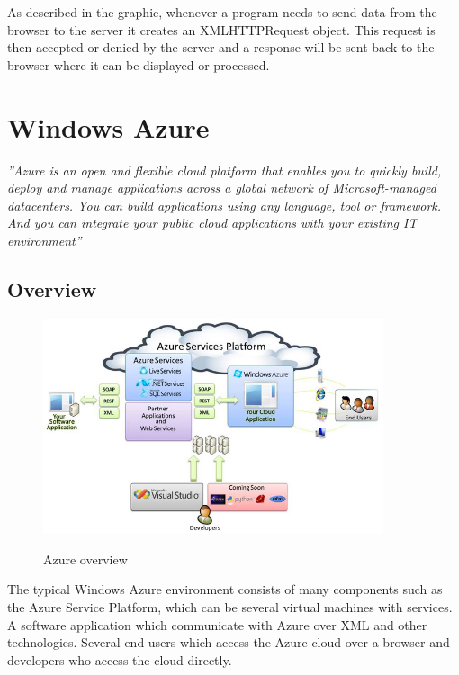   As described in the graphic, whenever a program needs to send data from the browser to the server it creates an XMLHTTPRequest object. This request is then accepted or denied by the server and a response will be sent back to the browser where it can be displayed or processed. 
  
  \section{Windows Azure}
  \textit{''Azure is an open and flexible cloud platform that enables you to quickly build, deploy and manage applications across a global network of Microsoft-managed datacenters. You can build applications using any language, tool or framework. And you can integrate your public cloud applications with your existing IT environment''}\cite{azure}
  \subsection{Overview}
  \begin{figure}[htbp]
  \centering
  \includegraphics[width=100mm,height=\textheight,keepaspectratio]{graphics/azurePlattform.jpg}
  \caption{Azure overview}\cite{azureOver}
  \end{figure}
  
  The typical Windows Azure environment consists of many components such as the Azure Service Platform, which can be several virtual machines with services. A software application which communicate with Azure over XML and other technologies. Several end users which access the Azure cloud over a browser and developers who access the cloud directly. 
  \newpage
